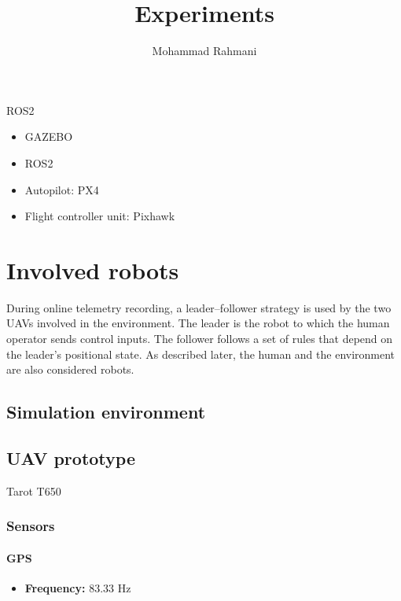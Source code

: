 \documentclass[a4paper]{article}
\title{Experiments}
\date{}
\author{Mohammad Rahmani}
\begin{document}
   \maketitle
   ROS2
   \begin{itemize}
      \item GAZEBO
      \item ROS2
      \item Autopilot: PX4
      \item Flight controller unit: Pixhawk
   \end{itemize}


   \section{Involved robots}
      During online telemetry recording, a leader--follower strategy is used by the two UAVs involved in the environment. The leader is the robot to which the human operator sends control inputs. The follower follows a set of rules that depend on the leader's positional state. As described later, the human and the environment are also considered robots.
      \subsection{Simulation environment}

      \subsection{UAV prototype}
         Tarot T650

         \subsubsection{Sensors}

            \paragraph{GPS}
               \begin{itemize}
                  \item \textbf{Frequency:} 83.33 Hz
               \end{itemize}
\end{document}
